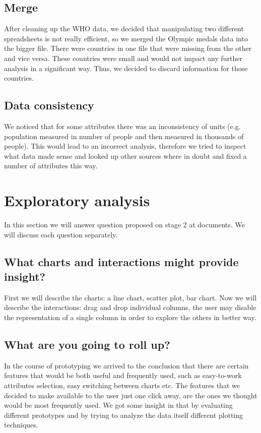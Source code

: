 \documentclass[a4paper]{article}
\begin{document}
\subsection{Merge}

After cleaning up the WHO data, we decided that manipulating two different spreadsheets is not really efficient, so we merged the Olympic medals data into the bigger file. There were countries in one file that were missing from the other and vice versa. These countries were small and would not impact any further analysis in a significant way. Thus, we decided to discard information for those countries.

\subsection{Data consistency}

We noticed that for some attributes there was an inconsistency of units (e.g. population measured in number of people and then measured in thousands of people). This would lead to an incorrect analysis, therefore we tried to inspect what data made sense and looked up other sources where in doubt and fixed a number of attributes this way.

\section{Exploratory analysis}
In this section we will answer question proposed on stage 2 at documents. We will discuss each question separately.


\subsection{What charts and interactions might provide insight?}

First we will describe the charts: a line chart, scatter plot, bar chart. Now we will describe the interactions: drag and drop individual columns, the user may disable the representation of a single column in order to explore the others in better way.

\subsection{What are you going to roll up?}

In the course of prototyping we arrived to the conclusion that there are certain features that would be both useful and frequently used, such as easy-to-work attributes selection, easy switching between charts etc. The features that we decided to make available to the user just one click away, are the ones we thought would be most frequently used. We got some insight in that by evaluating different prototypes and by trying to analyze the data itself different plotting techniques.
\end{document}

